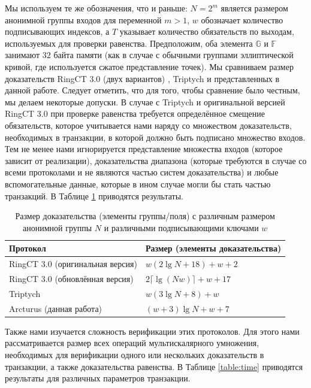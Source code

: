 \documentclass{article}
\newcommand{\F}{\mathbb{F}}
\theoremstyle{definition}
\begin{document}
Мы используем те же обозначения, что и раньше: $N = 2^m$ является размером анонимной группы входов для переменной $m > 1$, $w$ обозначает количество подписывающих индексов, а $T$ указывает количество обязательств по выходам, используемых для проверки равенства.
Предположим, оба элемента \begin{math}\mathbb{G}\end{math} и $\F$ занимают $32$ байта памяти (как в случае с обычными группами эллиптической кривой, где используется сжатое представление точек). Мы сравниваем размер доказательств RingCT 3.0 (двух вариантов) \cite{rct3}, Triptych \cite{triptych} и представленных в данной работе.
Следует отметить, что для того, чтобы сравнение было честным, мы делаем некоторые допуски.
В случае с Triptych и оригинальной версией RingCT 3.0 при проверке равенства требуется определённое смещение обязательств, которое учитывается нами наряду со множеством доказательств, необходимых в транзакции, в которой должно быть подписано множество входов.
Тем не менее нами игнорируется представление множества входов (которое зависит от реализации), доказательства диапазона (которые требуются в случае со всеми протоколами и не являются частью систем доказательства) и любые вспомогательные данные, которые в ином случае могли бы стать частью транзакций.
В Таблице \ref{table:size} приводятся результаты.

\begin{table}
\centering
\begin{tabular}{|ll|}
\hline
Протокол & Размер (элементы доказательства) \\
\hline
RingCT 3.0 (оригинальная версия) \cite{rct3} & $w(2 \lg N + 18) + w + 2$ \\
RingCT 3.0 (обновлённая версия) \cite{rct3} & $2\lceil \lg(Nw) \rceil + w + 17$ \\
Triptych \cite{triptych} & $w(3 \lg N + 8) + w$ \\
Arcturus (данная работа) & $(w + 3)\lg N + w + 7$ \\
\hline
\end{tabular}
\caption{Размер доказательства (элементы группы/поля) с различным размером анонимной группы $N$ и различными подписывающими ключами $w$}
\label{table:size}
\end{table}

Также нами изучается сложность верификации этих протоколов.
Для этого нами рассматривается размер всех операций мультискалярного умножения, необходимых для верификации одного или нескольких доказательств в транзакции, а также доказательства равенства.
В Таблице \ref{table:time} приводятся результаты для различных параметров транзакции.
\end{document}
